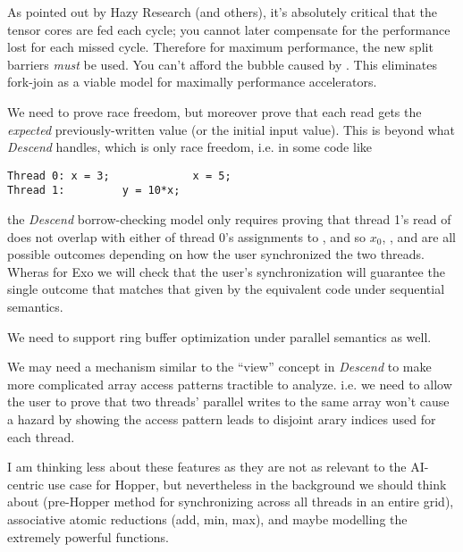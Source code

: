 \filbreak
{} As pointed out by Hazy Research (and others), it's absolutely critical that the tensor cores are fed each cycle; you cannot later compensate for the performance lost for each missed cycle. Therefore for maximum performance, the new split barriers \textit{must} be used. You can't afford the bubble caused by . This eliminates fork-join as a viable model for maximally performance accelerators.

\filbreak
{} We need to prove race freedom, but moreover prove that each read gets the \textit{expected} previously-written value (or the initial input value). This is beyond what \textit{Descend} handles, which is only race freedom, i.e. in some code like

{\color{lightttColor}
\begin{verbatim}
Thread 0: x = 3;             x = 5;
Thread 1:         y = 10*x;
\end{verbatim}
}

the \textit{Descend} borrow-checking model only requires proving that thread 1's read of  does not overlap with either of thread 0's assignments to , and so $x_0$, , and  are all possible outcomes depending on how the user synchronized the two threads. Wheras for Exo we will check that the user's synchronization will guarantee the single outcome that matches that given by the equivalent code under sequential semantics.

\filbreak
{} We need to support ring buffer optimization under parallel semantics as well.

\filbreak
{} We may need a mechanism similar to the ``view'' concept in \textit{Descend} to make more complicated array access patterns tractible to analyze. i.e. we need to allow the user to prove that two threads' parallel writes to the same array won't cause a hazard by showing the access pattern leads to disjoint arary indices used for each thread.

\filbreak
{} I am thinking less about these features as they are not as relevant to the AI-centric use case for Hopper, but nevertheless in the background we should think about  (pre-Hopper method for synchronizing across all threads in an entire grid), associative atomic reductions (add, min, max), and maybe modelling the extremely powerful  functions.

